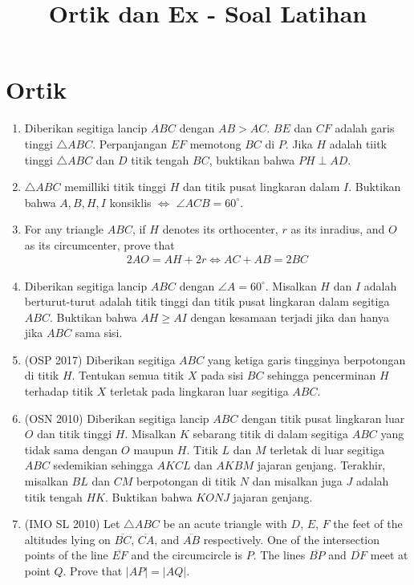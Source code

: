 \documentclass[12pt]{scrartcl}
\title{Ortik dan Ex - Soal Latihan}
\begin{document}
\maketitle
\section{Ortik}
\begin{enumerate}
\item Diberikan segitiga lancip $ABC$ dengan $AB>AC$. $BE$ dan $CF$ adalah garis tinggi $\triangle ABC$. Perpanjangan $EF$ memotong $BC$ di $P$. Jika $H$ adalah tiitk tinggi $\triangle ABC$ dan $D$ titik tengah $BC$, buktikan bahwa $PH \perp AD$.

\item $\triangle ABC$ memilliki titik tinggi $H$ dan titik pusat lingkaran dalam $I$. Buktikan bahwa $A,B,H,I$ konsiklis $\iff$ $\angle ACB = 60^\circ$.

\item For any triangle $ABC$, if $H$ denotes its orthocenter, $r$ as its inradius, and $O$ as its circumcenter, prove that 
 \begin{align*}
     2AO = AH + 2r \iff AC+AB=2BC
 \end{align*}

\item Diberikan segitiga lancip $ABC$ dengan $\angle A = 60^\circ$. Misalkan $H$ dan $I$ adalah berturut-turut adalah titik tinggi dan titik pusat lingkaran dalam segitiga $ABC$. Buktikan bahwa $AH \ge AI$ dengan kesamaan terjadi jika dan hanya jika $ABC$ sama sisi.

\item (OSP 2017) Diberikan segitiga $ABC$ yang ketiga garis tingginya berpotongan di titik $H$. Tentukan semua titik $X$ pada sisi $BC$ sehingga pencerminan $H$ terhadap titik $X$ terletak pada lingkaran luar segitiga $ABC$.

\item (OSN 2010) Diberikan segitiga lancip $ABC$ dengan titik pusat lingkaran luar $O$ dan titik tinggi $H$. Misalkan $K$ sebarang titik di dalam segitiga $ABC$ yang tidak sama dengan $O$ maupun $H$. Titik $L$ dan $M$ terletak di luar segitiga $ABC$ sedemikian sehingga $AKCL$ dan $AKBM$ jajaran genjang. Terakhir, misalkan $BL$ dan $CM$ berpotongan di titik $N$ dan misalkan juga $J$ adalah titik tengah $HK$. Buktikan bahwa $KONJ$ jajaran genjang.

\item (IMO SL 2010) Let $\triangle ABC$ be an acute triangle with $D$, $E$, $F$ the feet of the altitudes lying on $\overline{BC}$, $\overline{CA}$, and $\overline{AB}$ respectively. One of the intersection points of the line $\overline{EF}$ and the circumcircle is $P$. The lines $\overline{BP}$ and $\overline{DF}$ meet at point $Q$. Prove that $|AP| = |AQ|$.


\end{enumerate}
\end{document}
